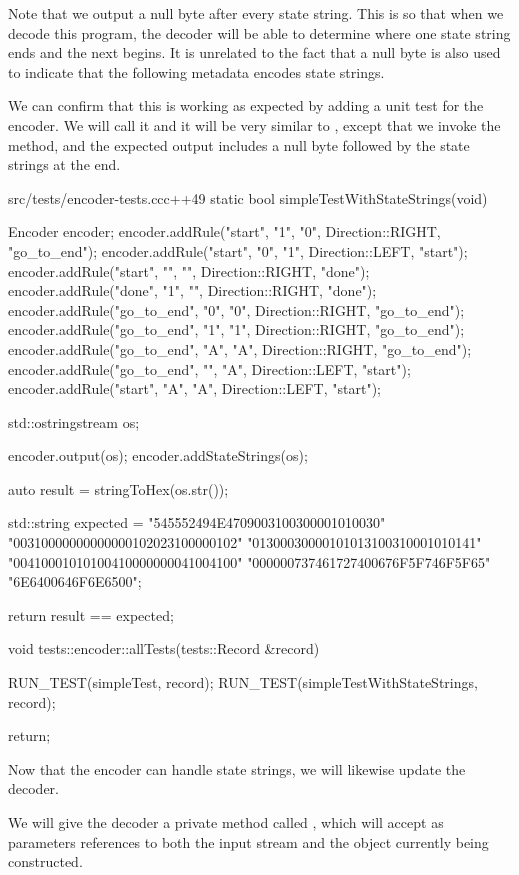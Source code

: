 Note that we output a null byte after every state string. This is so that when we decode this program, the decoder will be able to determine where one state string ends and the next begins. It is unrelated to the fact that a null byte is also used to indicate that the following metadata encodes state strings.

We can confirm that this is working as expected by adding a unit test for the encoder. We will call it  and it will be very similar to , except that we invoke the  method, and the expected output includes a null byte followed by the state strings at the end.

\begin{file}{src/tests/encoder-tests.cc}{c++}{49}
static bool simpleTestWithStateStrings(void)
{
    Encoder encoder;
    encoder.addRule("start", "1", "0", Direction::RIGHT, "go_to_end");
    encoder.addRule("start", "0", "1", Direction::LEFT, "start");
    encoder.addRule("start", "", "", Direction::RIGHT, "done");
    encoder.addRule("done", "1", "", Direction::RIGHT, "done");
    encoder.addRule("go_to_end", "0", "0", Direction::RIGHT, "go_to_end");
    encoder.addRule("go_to_end", "1", "1", Direction::RIGHT, "go_to_end");
    encoder.addRule("go_to_end", "A", "A", Direction::RIGHT, "go_to_end");
    encoder.addRule("go_to_end", "", "A", Direction::LEFT, "start");
    encoder.addRule("start", "A", "A", Direction::LEFT, "start");

    std::ostringstream os;

    encoder.output(os);
    encoder.addStateStrings(os);

    auto result = stringToHex(os.str());

    std::string expected =
        "545552494E4709003100300001010030"
        "00310000000000000102023100000102"
        "01300030000101013100310001010141"
        "00410001010100410000000041004100"
        "000000737461727400676F5F746F5F65"
        "6E6400646F6E6500";

    return result == expected;
}

void tests::encoder::allTests(tests::Record &record)
{
    RUN_TEST(simpleTest, record);
    RUN_TEST(simpleTestWithStateStrings, record);

    return;
}
\end{file}

Now that the encoder can handle state strings, we will likewise update the decoder.

We will give the decoder a private method called , which will accept as parameters references to both the input stream and the  object currently being constructed.

